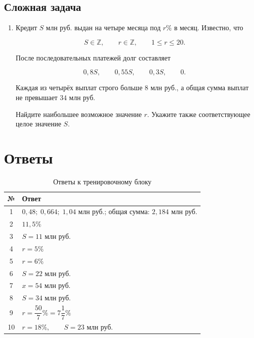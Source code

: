 \documentclass[a4paper,12pt]{article}
\begin{document}
\subsection*{Сложная задача}

\begin{enumerate}[leftmargin=2em,itemsep=1em,start=10]

\item
Кредит \(S\) млн руб. выдан на четыре месяца под \(r\%\) в месяц.
Известно, что

\[
S\in\mathbb Z,\qquad
r\in\mathbb Z,\qquad
1\le r\le20.
\]

После последовательных платежей долг составляет

\[
0{,}8S,\qquad
0{,}55S,\qquad
0{,}3S,\qquad
0.
\]

Каждая из четырёх выплат строго больше \(8\) млн руб., а общая сумма
выплат не превышает \(34\) млн руб.

Найдите наибольшее возможное значение \(r\).
Укажите также соответствующее целое значение \(S\).

\end{enumerate}


\newpage

\section*{Ответы}

\begin{table}[h]
\centering
\caption{Ответы к тренировочному блоку}
\renewcommand{\arraystretch}{1.5}
\begin{tabularx}{\linewidth}{c X}
\toprule
№ & Ответ \\
\midrule

1 &
\(
0{,}48;\;
0{,}664;\;
1{,}04
\) млн руб.;
общая сумма:
\(
2{,}184
\) млн руб. \\

2 &
\(
11{,}5\%
\) \\

3 &
\(
S=11
\) млн руб. \\

4 &
\(
r=5\%
\) \\

5 &
\(
r=6\%
\) \\

6 &
\(
S=22
\) млн руб. \\

7 &
\(
x=54
\) млн руб. \\

8 &
\(
S=34
\) млн руб. \\

9 &
\(
r=\dfrac{50}{7}\%
=
7\dfrac17\%
\) \\

10 &
\(
r=18\%,\qquad S=23
\) млн руб. \\

\bottomrule
\end{tabularx}
\end{table}
\end{document}
